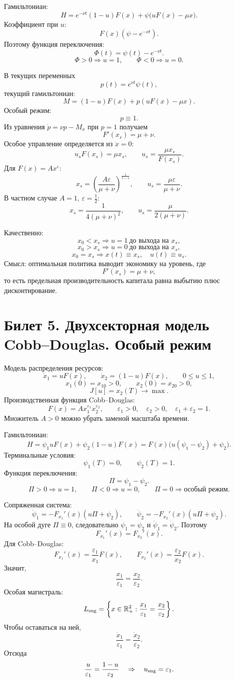 \documentclass[12pt,a4paper]{article}
\begin{document}
Гамильтониан:
\[
H=e^{-\nu t}(1-u)F(x)+\psi\bigl(uF(x)-\mu x\bigr).
\]
Коэффициент при $u$:
\[
F(x)(\psi-e^{-\nu t}).
\]
Поэтому функция переключения:
\[
\Phi(t)=\psi(t)-e^{-\nu t}.
\]
\[
\Phi>0\Rightarrow u=1,\qquad \Phi<0\Rightarrow u=0.
\]

В текущих переменных
\[
p(t)=e^{\nu t}\psi(t),
\]
текущий гамильтониан:
\[
M=(1-u)F(x)+p(uF(x)-\mu x).
\]
Особый режим:
\[
p\equiv1.
\]
Из уравнения $\dot p=\nu p-M_x$ при $p=1$ получаем
\[
F'(x_s)=\mu+\nu.
\]
Особое управление определяется из $\dot x=0$:
\[
u_sF(x_s)=\mu x_s,
\qquad
u_s=\frac{\mu x_s}{F(x_s)}.
\]
Для $F(x)=Ax^\varepsilon$:
\[
x_s=\left(\frac{A\varepsilon}{\mu+\nu}\right)^{\frac{1}{1-\varepsilon}},
\qquad
u_s=\frac{\mu\varepsilon}{\mu+\nu}.
\]
В частном случае $A=1$, $\varepsilon=\frac12$:
\[
x_s=\frac{1}{4(\mu+\nu)^2},
\qquad
u_s=\frac{\mu}{2(\mu+\nu)}.
\]

Качественно:
\[
x_0<x_s\Rightarrow u=1\ \text{до выхода на }x_s,
\]
\[
x_0>x_s\Rightarrow u=0\ \text{до выхода на }x_s,
\]
\[
x_0=x_s\Rightarrow x(t)\equiv x_s,
\quad u(t)\equiv u_s.
\]
Смысл: оптимальная политика выводит экономику на уровень, где
\[
F'(x_s)=\mu+\nu,
\]
то есть предельная производительность капитала равна выбытию плюс дисконтирование.

\section*{Билет 5. Двухсекторная модель Cobb--Douglas. Особый режим}

Модель распределения ресурсов:
\[
\dot x_1=uF(x),\qquad \dot x_2=(1-u)F(x),
\qquad 0\le u\le1,
\]
\[
x_1(0)=x_{10}>0,
\qquad x_2(0)=x_{20}>0,
\]
\[
J[u]=x_2(T)\to\max.
\]
Производственная функция Cobb--Douglas:
\[
F(x)=Ax_1^{\varepsilon_1}x_2^{\varepsilon_2},
\qquad
\varepsilon_1>0,
\quad \varepsilon_2>0,
\quad \varepsilon_1+\varepsilon_2=1.
\]
Множитель $A>0$ можно убрать заменой масштаба времени.

Гамильтониан:
\[
H=\psi_1uF(x)+\psi_2(1-u)F(x)
=F(x)\bigl(u(\psi_1-\psi_2)+\psi_2\bigr).
\]
Терминальные условия:
\[
\psi_1(T)=0,
\qquad
\psi_2(T)=1.
\]
Функция переключения:
\[
\Pi=\psi_1-\psi_2.
\]
\[
\Pi>0\Rightarrow u=1,
\qquad
\Pi<0\Rightarrow u=0,
\qquad
\Pi=0\Rightarrow \text{особый режим}.
\]

Сопряженная система:
\[
\dot\psi_1=-F_{x_1}'(x)(u\Pi+\psi_2),
\qquad
\dot\psi_2=-F_{x_2}'(x)(u\Pi+\psi_2).
\]
На особой дуге $\Pi\equiv0$, следовательно $\psi_1=\psi_2$ и $\dot\psi_1=\dot\psi_2$. Поэтому
\[
F_{x_1}'(x)=F_{x_2}'(x).
\]
Для Cobb--Douglas:
\[
F_{x_1}'(x)=\frac{\varepsilon_1}{x_1}F(x),
\qquad
F_{x_2}'(x)=\frac{\varepsilon_2}{x_2}F(x).
\]
Значит,
\[
\frac{x_1}{\varepsilon_1}=\frac{x_2}{\varepsilon_2}.
\]
Особая магистраль:
\[
L_{\rm sng}=\left\{x\in\mathbb R_+^2:\frac{x_1}{\varepsilon_1}=\frac{x_2}{\varepsilon_2}\right\}.
\]
Чтобы оставаться на ней,
\[
\frac{\dot x_1}{\varepsilon_1}=\frac{\dot x_2}{\varepsilon_2}.
\]
Отсюда
\[
\frac{u}{\varepsilon_1}=\frac{1-u}{\varepsilon_2}
\quad\Rightarrow\quad
u_{\rm sng}=\varepsilon_1.
\]
\end{document}
